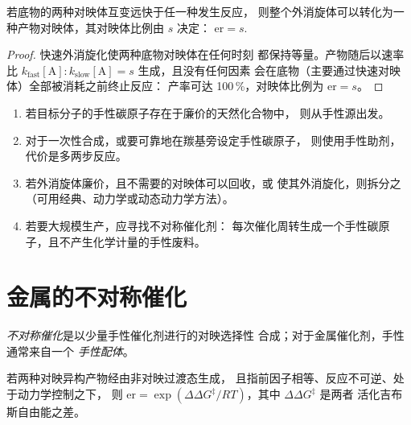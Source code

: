 \begin{proposition}[动态动力学拆分]\label{prop:b3:asymmetric-synthesis:dkr}
若底物的两种对映体互变远快于任一种发生反应，
则整个外消旋体可以转化为一种产物对映体，其对映体比例由 $s$ 决定：
$\mathrm{er} = s$.
\end{proposition}

\begin{proof}
快速外消旋化使两种底物对映体在任何时刻
都保持等量。产物随后以速率比 $k_{\mathrm{fast}}[\mathrm A] : k_{\mathrm{slow}}[\mathrm A] = s$ 生成，且没有任何因素
会在底物（主要通过快速对映体）全部被消耗之前终止反应：
产率可达 100\,\%，对映体比例为 $\mathrm{er} = s$。
\end{proof}

\begin{method}[选择策略]\label{met:b3:asymmetric-synthesis:strategy}
\begin{enumerate}
  \item 若目标分子的手性碳原子存在于廉价的天然化合物中，
        则从手性源出发。
  \item 对于一次性合成，或要可靠地在羰基旁设定手性碳原子，
        则使用手性助剂，代价是多两步反应。
  \item 若外消旋体廉价，且不需要的对映体可以回收，或
        使其外消旋化，则拆分之（可用经典、动力学或动态动力学方法）。
  \item 若要大规模生产，应寻找不对称催化剂：
        每次催化周转生成一个手性碳原子，且不产生化学计量的手性废料。
\end{enumerate}
\end{method}

\section{金属的不对称催化}

\begin{definition}[不对称催化]\label{def:b3:asymmetric-synthesis:asymmetric-catalysis}
\emph{不对称催化}是以少量手性催化剂进行的对映选择性
合成；对于金属催化剂，手性通常来自一个
\emph{手性配体}。
\end{definition}

\begin{theorem}[由能量得到的选择性]\label{thm:b3:asymmetric-synthesis:er-ddg}
若两种对映异构产物经由非对映过渡态生成，
且指前因子相等、反应不可逆、处于动力学控制之下，
则 $\mathrm{er} = \exp(\Delta\Delta G^\ddagger/RT)$，其中 $\Delta\Delta G^\ddagger$ 是两者
活化吉布斯自由能之差。
\end{theorem}

